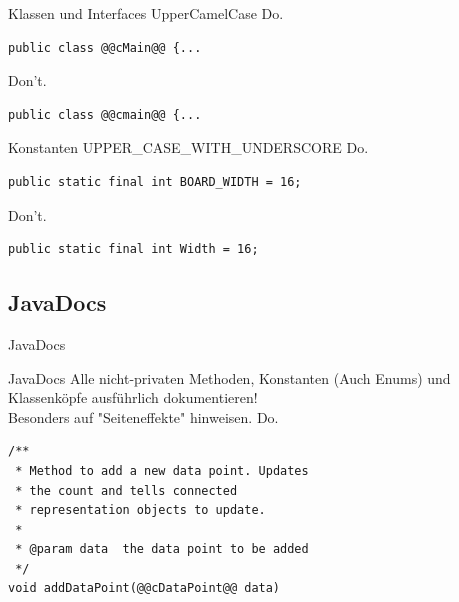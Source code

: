 \documentclass[aspectratio=169]{beamer}
\begin{document}
\begin{frame}[fragile]
  \begin{block}{Klassen und Interfaces}
    UpperCamelCase \linebreak
    \pause
    \color{nicegreen}Do.\color{FGround}
    \begin{lstlisting}[numbers=none]
public class @@cMain@@ {...
    \end{lstlisting}
    \pause
    \color{alertcolor}Don't.\color{FGround}
    \begin{lstlisting}[numbers=none]
public class @@cmain@@ {...
    \end{lstlisting}
  \end{block}

  \begin{block}{Konstanten}
    UPPER\_CASE\_WITH\_UNDERSCORE \linebreak
    \pause
    \color{nicegreen}Do.\color{FGround}
    \begin{lstlisting}[numbers=none]
public static final int BOARD_WIDTH = 16;
    \end{lstlisting}
    \pause
    \color{alertcolor}Don't.\color{FGround}
    \begin{lstlisting}[numbers=none]
public static final int Width = 16;
    \end{lstlisting}
  \end{block}
\end{frame}

\subsection{JavaDocs}
\begin{frame}[fragile]{JavaDocs}
  \begin{block}{JavaDocs}
    Alle nicht-privaten Methoden, Konstanten (Auch Enums) und Klassenköpfe ausführlich dokumentieren! \\
    Besonders auf "Seiteneffekte" hinweisen. \linebreak
    \pause
    \color{nicegreen}Do.\color{FGround}
    \begin{lstlisting}[numbers=none]
/** 
 * Method to add a new data point. Updates 
 * the count and tells connected  
 * representation objects to update. 
 *
 * @param data  the data point to be added 
 */ 
void addDataPoint(@@cDataPoint@@ data) 
    \end{lstlisting}
  \end{block}
\end{frame}
\end{document}
